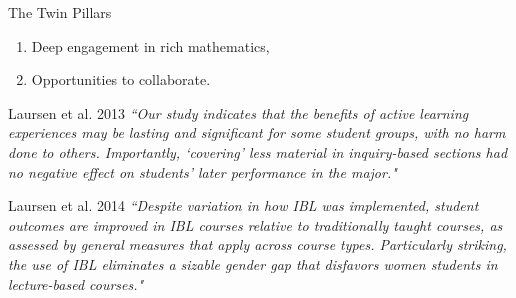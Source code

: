\documentclass[10pt,handout]{beamer}
\begin{document}
\begin{frame}

\begin{block}{The Twin Pillars}
\begin{enumerate}
\item Deep engagement in rich mathematics,
\item Opportunities to collaborate.
\end{enumerate}
\end{block}

\begin{block}{Laursen et al. 2013}
\emph{``Our study indicates that the benefits of active learning experiences may be lasting and significant for some student groups, with no harm done to others. Importantly, ‘covering’ less material in inquiry-based sections had no negative effect on students' later performance in the major."}
\end{block}

\begin{block}{Laursen et al. 2014}
\emph{``Despite variation in how IBL was implemented, student outcomes are improved in IBL courses relative to traditionally taught courses, as assessed by general measures that apply across course types. Particularly striking, the use of IBL eliminates a sizable gender gap that disfavors women students in lecture-based courses."}
\end{block}

\end{frame}




\end{document}
